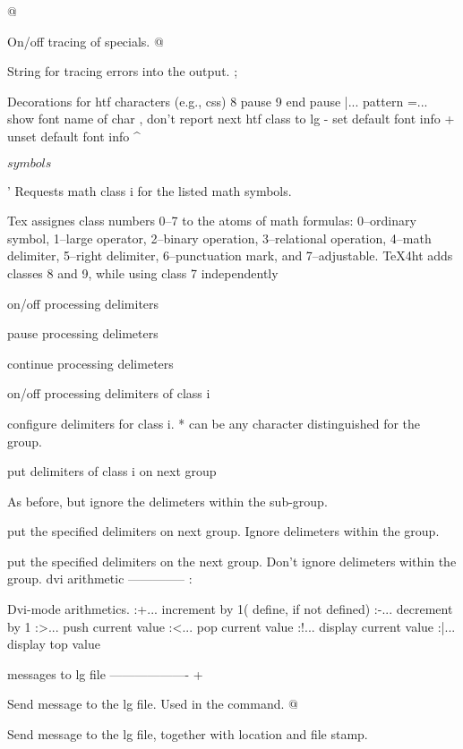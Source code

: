 {{{{  @      
           On/off tracing of specials.
  @     
           String for tracing errors into the output.
  ;             
           Decorations for htf characters (e.g., css)
              8    pause
              9    end pause
              |... pattern
              =... show font name of char
              ,    don't report next htf class to lg
              -    set default font info
              +    unset default font info
  ^    $symbols$}' 
           Requests math class i for the listed math symbols.
           
           Tex assignes class numbers 0--7 to the atoms of math
           formulas: 0--ordinary symbol, 1--large operator, 2--binary
           operation, 3--relational operation, 4--math delimiter,
           5--right delimiter, 6--punctuation mark, and 7--adjustable.
           TeX4ht adds classes  8 and 9, while using 
           class 7 independently
           on/off processing delimiters
           pause processing delimeters
           continue processing delimeters
           on/off processing delimiters of class i   
           configure delimiters for class i. * can be any 
           character distinguished for the group.
           put delimiters of class i on next group
           As before, but ignore the delimeters within the sub-group.
           put the specified delimiters on next group.
           Ignore delimeters within the group.
           put the specified delimiters on the next group.
           Don't ignore delimeters within the group.
                                                    dvi arithmetic
                                                    --------------
  :    
           Dvi-mode arithmetics.  
             :+...  increment by 1( define, if not defined)
             :-...  decrement by 1
             :>...  push current value
             :<...  pop current value
             :!...  display current value
             :|...  display top value

                                                    messages to lg file
                                                    -------------------
  +    
           Send message to the lg file.  Used in the  command. 
  @    
           Send message to the lg file, together with location and file
           stamp.

}}}
